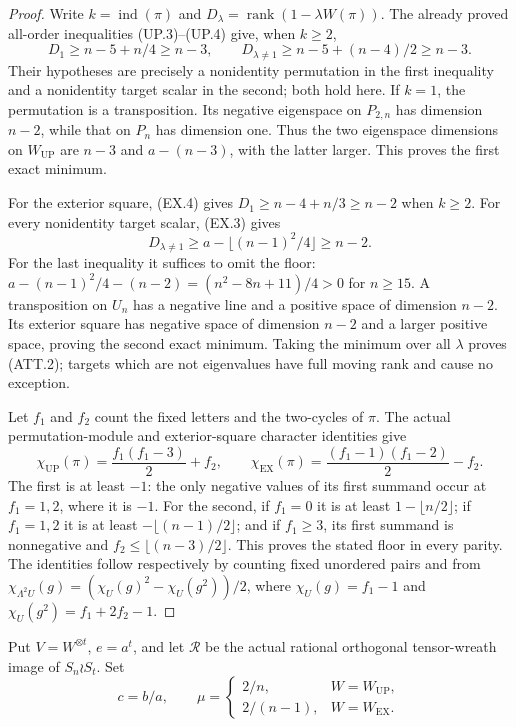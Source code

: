 \begin{proof}
Write $k=\operatorname{ind}(\pi)$ and
$D_\lambda=\operatorname{rank}(1-\lambda W(\pi))$.
The already proved all-order inequalities (UP.3)--(UP.4) give,
when $k\ge2$,
\[
 D_1\ge n-5+n/4\ge n-3,
 \qquad
 D_{\lambda\ne1}\ge n-5+(n-4)/2\ge n-3.                   \tag{ATT.3}
\]
Their hypotheses are precisely a nonidentity permutation in
the first inequality and a nonidentity target scalar in the
second; both hold here. If $k=1$, the permutation is a
transposition. Its negative eigenspace on $P_{2,n}$ has
dimension $n-2$, while that on $P_n$ has dimension one.
Thus the two eigenspace dimensions on $W_{\mathrm{UP}}$ are
$n-3$ and $a-(n-3)$, with the latter larger. This proves
the first exact minimum.

For the exterior square, (EX.4) gives
$D_1\ge n-4+n/3\ge n-2$ when $k\ge2$.
For every nonidentity target scalar, (EX.3) gives
\[
 D_{\lambda\ne1}\ge
 a-\lfloor(n-1)^2/4\rfloor\ge n-2.                       \tag{ATT.4}
\]
For the last inequality it suffices to omit the floor:
$a-(n-1)^2/4-(n-2)=(n^2-8n+11)/4>0$ for $n\ge15$.
A transposition on $U_n$ has a negative line and a positive
space of dimension $n-2$. Its exterior square has negative
space of dimension $n-2$ and a larger positive space, proving
the second exact minimum. Taking the minimum over all
$\lambda$ proves (ATT.2); targets which are not eigenvalues
have full moving rank and cause no exception.

Let $f_1$ and $f_2$ count the fixed letters and the two-cycles
of $\pi$. The actual permutation-module and exterior-square
character identities give
\[
 \chi_{\mathrm{UP}}(\pi)=\frac{f_1(f_1-3)}2+f_2,
 \qquad
 \chi_{\mathrm{EX}}(\pi)
     =\frac{(f_1-1)(f_1-2)}2-f_2.                          \tag{ATT.5}
\]
The first is at least $-1$: the only negative values of its
first summand occur at $f_1=1,2$, where it is $-1$.
For the second, if $f_1=0$ it is at least $1-\lfloor n/2\rfloor$;
if $f_1=1,2$ it is at least $-\lfloor(n-1)/2\rfloor$;
and if $f_1\ge3$, its first summand is nonnegative and
$f_2\le\lfloor(n-3)/2\rfloor$. This proves the stated floor
in every parity. The identities follow respectively by counting
fixed unordered pairs and from
$\chi_{\Lambda^2U}(g)=(\chi_U(g)^2-\chi_U(g^2))/2$,
where $\chi_U(g)=f_1-1$ and $\chi_U(g^2)=f_1+2f_2-1$.
\end{proof}

Put $V=W^{\otimes t}$, $e=a^t$, and let $\mathcal R$ be the
actual rational orthogonal tensor-wreath image of $S_n\wr S_t$.
Set
\[
 c=b/a,
 \qquad
 \mu=\begin{cases}2/n,&W=W_{\mathrm{UP}},\\
                  2/(n-1),&W=W_{\mathrm{EX}}.
       \end{cases}                                       \tag{ATT.6}
\]

